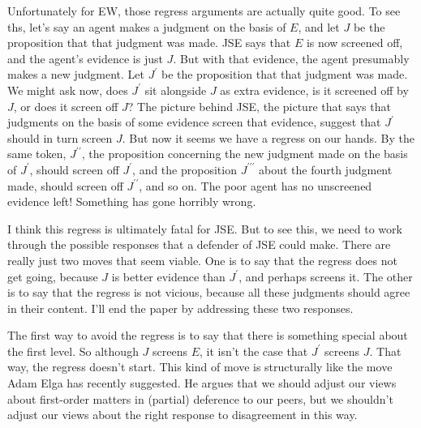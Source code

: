 Unfortunately for EW, those regress arguments are actually quite good. To see ths, let's say an agent makes a judgment on the basis of \(E\), and let \(J\) be the proposition that that judgment was made. JSE says that \(E\) is now screened off, and the agent's evidence is just \(J\). But with that evidence, the agent presumably makes a new judgment. Let \(J^\prime\) be the proposition that that judgment was made. We might ask now, does \(J^\prime\) sit alongside \(J\) as extra evidence, is it screened off by \(J\), or does it screen off \(J\)? The picture behind JSE, the picture that says that judgments on the basis of some evidence screen that evidence, suggest that \(J^\prime\) should in turn screen \(J\). But now it seems we have a regress on our hands. By the same token, \(J^{\prime \prime}\), the proposition concerning the new judgment made on the basis of \(J^\prime\), should screen off \(J^\prime\), and the proposition \(J^{\prime \prime \prime}\) about the fourth judgment made, should screen off \(J^{\prime \prime}\), and so on. The poor agent has no unscreened evidence left! Something has gone horribly wrong.

I think this regress is ultimately fatal for JSE. But to see this, we need to work through the possible responses that a defender of JSE could make. There are really just two moves that seem viable. One is to say that the regress does not get going, because \(J\) is better evidence than \(J^\prime\), and perhaps screens it. The other is to say that the regress is not vicious, because all these judgments should agree in their content.  I'll end the paper by addressing these two responses.

The first way to avoid the regress is to say that there is something special about the first level. So although \(J\) screens \(E\), it isn't the case that \(J^\prime\) screens \(J\). That way, the regress doesn't start. This kind of move is structurally like the move Adam Elga \citeyearpar{Elga2010-ELGHTD} has recently suggested. He argues that we should adjust our views about first-order matters in (partial) deference to our peers, but we shouldn't adjust our views about the right response to disagreement in this way.

